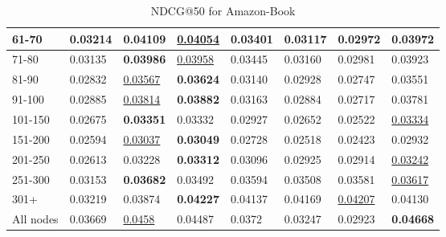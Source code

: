 \begin{table}[]
\begin{tabular}{|l|l|l|l|l|l|l||l|}
        61-70       & 0.03214                        & \textbf{0.04109}               & \underline{0.04054}            & 0.03401                        & 0.03117                        & 0.02972                        & 0.03972                    \\ \hline
        71-80       & 0.03135                        & \textbf{0.03986}               & \underline{0.03958}            & 0.03445                        & 0.03160                        & 0.02981                        & 0.03923                    \\ \hline
        81-90       & 0.02832                        & \underline{0.03567}            & \textbf{0.03624}               & 0.03140                        & 0.02928                        & 0.02747                        & 0.03551                    \\ \hline
        91-100      & 0.02885                        & \underline{0.03814}            & \textbf{0.03882}               & 0.03163                        & 0.02884                        & 0.02717                        & 0.03781                    \\ \hline
        101-150     & 0.02675                        & \textbf{0.03351}               & 0.03332                        & 0.02927                        & 0.02652                        & 0.02522                        & \underline{0.03334}        \\ \hline
        151-200     & 0.02594                        & \underline{0.03037}            & \textbf{0.03049}               & 0.02728                        & 0.02518                        & 0.02423                        & 0.02932                    \\ \hline
        201-250     & 0.02613                        & 0.03228                        & \textbf{0.03312}               & 0.03096                        & 0.02925                        & 0.02914                        & \underline{0.03242}        \\ \hline
        251-300     & 0.03153                        & \textbf{0.03682}               & 0.03492                        & 0.03594                        & 0.03508                        & 0.03581                        & \underline{0.03617}        \\ \hline
        301+        & 0.03219                        & 0.03874                        & \textbf{0.04227}               & 0.04137                        & 0.04169                        & \underline{0.04207}            & 0.04130                    \\ \hline
        All nodes     & 0.03669                        & \underline{0.0458}             & 0.04487                        & 0.0372                         & 0.03247                        & 0.02923                        & \textbf{0.04668}           \\ \hline
    \end{tabular}
    \caption{NDCG@50 for Amazon-Book}
    \label{tab:amazon-book-NDCG-evaluation}
\end{table}
